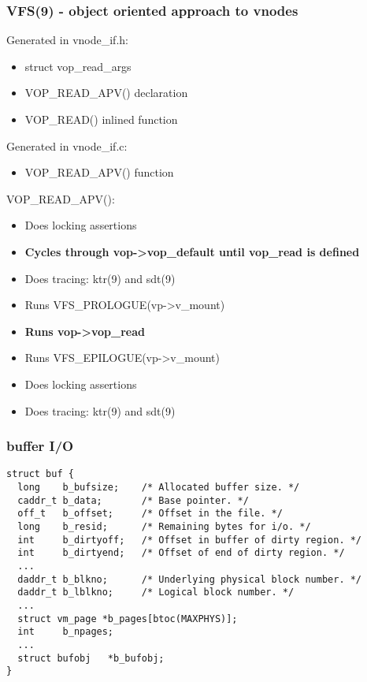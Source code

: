 \documentclass{beamer}
\begin{document}
\begin{frame}
\frametitle{VFS(9) - object oriented approach to vnodes}
 {
Generated in vnode\_if.h:
\begin{itemize}
  \item{struct vop\_read\_args}
  \item{VOP\_READ\_APV() declaration}
  \item{VOP\_READ() inlined function}
\end{itemize}
}
 {
Generated in vnode\_if.c:
\begin{itemize}
  \item{VOP\_READ\_APV() function}
\end{itemize}
}
 {
VOP\_READ\_APV():
\begin{itemize}
  \item{Does locking assertions}
  \item\textbf{Cycles through vop->vop\_default until vop\_read is defined}
  \item{Does tracing: ktr(9) and sdt(9)}
  \item{Runs VFS\_PROLOGUE(vp->v\_mount)}
  \item\textbf{Runs vop->vop\_read}
  \item{Runs VFS\_EPILOGUE(vp->v\_mount)}
  \item{Does locking assertions}
  \item{Does tracing: ktr(9) and sdt(9)}
\end{itemize}
}
\end{frame}


\begin{frame}[fragile]
\frametitle{buffer I/O}
\begin{verbatim}
struct buf {
  long    b_bufsize;    /* Allocated buffer size. */
  caddr_t b_data;       /* Base pointer. */
  off_t   b_offset;     /* Offset in the file. */
  long    b_resid;      /* Remaining bytes for i/o. */
  int     b_dirtyoff;   /* Offset in buffer of dirty region. */
  int     b_dirtyend;   /* Offset of end of dirty region. */
  ...
  daddr_t b_blkno;      /* Underlying physical block number. */
  daddr_t b_lblkno;     /* Logical block number. */
  ...
  struct vm_page *b_pages[btoc(MAXPHYS)];
  int     b_npages;
  ...
  struct bufobj   *b_bufobj;
}
\end{verbatim}
\end{frame}
\end{document}
